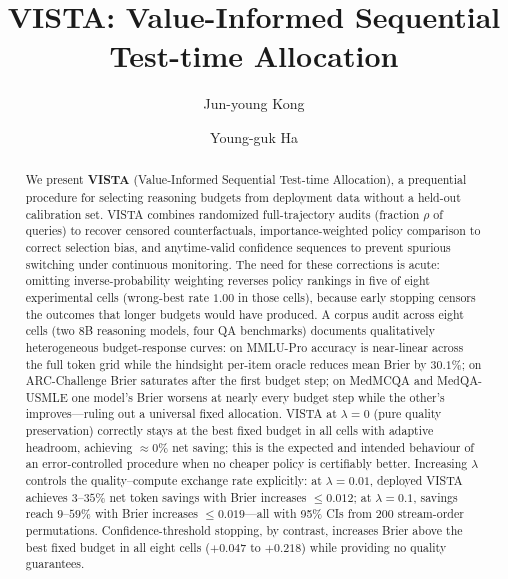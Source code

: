\documentclass[a4paper,fleqn]{cas-sc}
\theoremstyle{plain}
\theoremstyle{definition}
\theoremstyle{remark}
\begin{document}

\let\WriteBookmarks\relax
\def\floatpagefraction{0.7}
\def\textfraction{0.07}
\renewcommand{\topfraction}{0.9}
\renewcommand{\bottomfraction}{0.8}


\title[mode=title]{VISTA: Value-Informed Sequential Test-time Allocation}

\author[1]{Jun-young Kong}

\author[1]{Young-guk Ha\cormark[1]}



\begin{abstract}
We present \textbf{VISTA} (Value-Informed Sequential Test-time Allocation),
a prequential procedure for selecting reasoning budgets from deployment data
without a held-out calibration set.
VISTA combines randomized full-trajectory audits (fraction $\rho$ of queries)
to recover censored counterfactuals, importance-weighted policy comparison to
correct selection bias, and anytime-valid confidence sequences to prevent
spurious switching under continuous monitoring.
The need for these corrections is acute: omitting inverse-probability weighting
reverses policy rankings in five of eight experimental cells (wrong-best rate
$1.00$ in those cells), because early stopping censors the outcomes that longer
budgets would have produced.
A corpus audit across eight cells (two 8B reasoning models, four QA benchmarks)
documents qualitatively heterogeneous budget-response curves:
on MMLU-Pro accuracy is near-linear across the full token grid while the
hindsight per-item oracle reduces mean Brier by $30.1\%$;
on ARC-Challenge Brier saturates after the first budget step;
on MedMCQA and MedQA-USMLE one model's Brier worsens at nearly every budget
step while the other's improves---ruling out a universal fixed allocation.
VISTA at $\lambda{=}0$ (pure quality preservation) correctly stays at the
best fixed budget in all cells with adaptive headroom, achieving $\approx 0\%$ net
saving; this is the expected and intended behaviour of an error-controlled
procedure when no cheaper policy is certifiably better.
Increasing $\lambda$ controls the quality--compute exchange rate explicitly:
at $\lambda{=}0.01$, deployed VISTA achieves $3$--$35\%$ net token savings
with Brier increases $\leq 0.012$; at $\lambda{=}0.1$, savings reach
$9$--$59\%$ with Brier increases $\leq 0.019$---all with 95\% CIs from
200 stream-order permutations.
Confidence-threshold stopping, by contrast, increases Brier above the best
fixed budget in all eight cells ($+0.047$ to $+0.218$) while providing no
quality guarantees.
\end{abstract}
\end{document}
